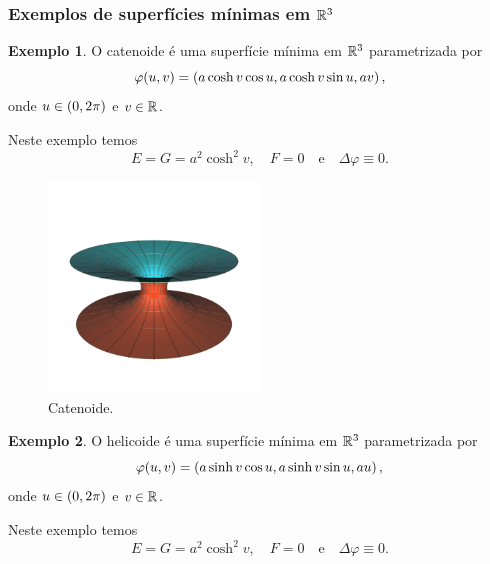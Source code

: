 \documentclass[10pt,a4paper]{beamer}
\theoremstyle{definition}
\newtheorem{exemplo}{Exemplo}
\begin{document}
\begin{frame}
	\frametitle{Exemplos de superfícies mínimas em $\mathbb R^3$}
	
	\begin{exemplo}
		O \alert{catenoide} é uma superfície mínima em $\mathbb R^3$ parametrizada por
		\begin{equation*}
		\varphi(u,v) = \left( a \cosh v \cos u, a \cosh v \sin u, a v \right),
		\end{equation*}
		onde  $u \in \left( 0, 2\pi \right)$ e $v \in \mathbb R$.
	\end{exemplo}
	
	Neste exemplo temos
	\begin{equation*}
	E = G = a^2 \cosh^2 v, \quad F = 0 \quad \text{e} \quad \Delta \varphi \equiv 0.
	\end{equation*}
	
\end{frame}

\begin{frame}
	
	\begin{figure}
		\centering
		\includegraphics[width=0.5\textwidth]{images/catenoid}
		\caption{Catenoide.}
	\end{figure}

\end{frame}

\begin{frame}

		\begin{exemplo}
		O \alert{helicoide} é uma superfície mínima em $\mathbb R^3$ parametrizada por
		\begin{equation*}
		\varphi(u,v) = \left( a \sinh v \cos u, a \sinh v \sin u, au \right),
		\end{equation*}
		onde $u \in \left( 0, 2\pi \right)$ e $v \in \mathbb R$.
	\end{exemplo}
	Neste exemplo temos
	\begin{equation*}
	E = G = a^2 \cosh^2 v, \quad F = 0 \quad \text{e} \quad \Delta \varphi \equiv 0.
	\end{equation*}
	
\end{frame}
\end{document}
